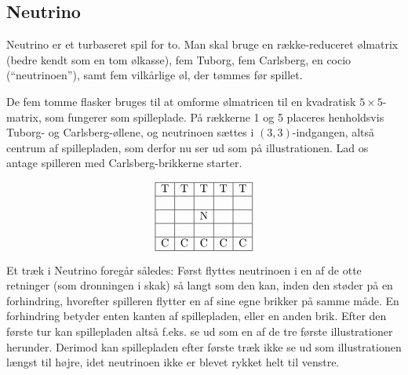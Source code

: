 \subsection{Neutrino}
Neutrino er et turbaseret spil for to. Man skal bruge en række-reduceret ølmatrix
(bedre kendt som en tom ølkasse), fem Tuborg, fem Carlsberg, en cocio (``neutrinoen''), samt fem vilkårlige øl, der tømmes før spillet.

De fem tomme flasker bruges til at omforme ølmatricen til en kvadratisk $5 \times 5$-matrix, som fungerer som spilleplade. På rækkerne 1 og 5 placeres henholdsvis Tuborg- og Carlsberg-øllene, og neutrinoen sættes i $(3, 3)$-indgangen, altså centrum af spillepladen, som derfor nu ser ud som på illustrationen. Lad os antage spilleren med Carlsberg-brikkerne starter.

\[
\begin{array}{|c|c|c|c|c|}
		\hline
		\text{T} & \text{T} & \text{T} & \text{T} & \text{T} \\ 
		\hline
		&    &     &    &     \\ 
		\hline
		&   & \text{N} &    &     \\ 
		\hline
		&   &    &     &     \\ 
		\hline
		\text{C} & \text{C} & \text{C} & \text{C} & \text{C} \\ 
		\hline
\end{array}
\]

Et træk i Neutrino foregår således: Først flyttes neutrinoen i en af de otte retninger (som dronningen i skak) så langt som den kan, inden den støder på en forhindring, hvorefter spilleren flytter en af sine egne brikker på samme måde. En forhindring betyder enten kanten af spillepladen, eller en anden brik. Efter den første tur kan spillepladen altså f.eks. se ud som en af de tre første illustrationer herunder. Derimod kan spillepladen efter første træk ikke se ud som illustrationen længst til højre, idet neutrinoen ikke er blevet rykket helt til venstre.

